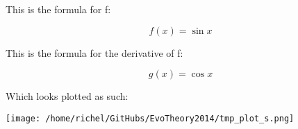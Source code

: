 \documentclass{article}
\begin{document}
This is the formula for f:

$$f\left(x\right)=\sin x$$

This is the formula for the derivative of f:

$$g\left(x\right)=\cos x$$

Which looks plotted as such:

\texttt{[image: /home/richel/GitHubs/EvoTheory2014/tmp\_plot\_s.png]}
\end{document}
